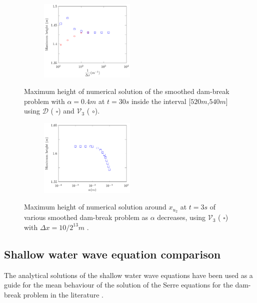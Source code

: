 \documentclass[times]{elsarticle}
\providecommand{\DIFadd}[1]{{\protect\color{blue}\uwave{#1}}} %
\providecommand{\DIFaddbegin}{} %
\providecommand{\DIFaddend}{} %
\begin{document}
\begin{figure}
	\centering
	\begin{subfigure}{\textwidth}
		\centering
		\includegraphics[width=0.5\textwidth]{Figure-28.pdf}
	\end{subfigure}
	\caption{Maximum height of numerical solution of the smoothed dam-break problem with $\alpha = 0.4m$ at $t=30s$ inside the interval [$520m$,$540m$] using $\mathcal{D}$ ({\color{blue} $\square$}) and $\mathcal{V}_3$ ({\color{red} $\circ$}).}
	\label{fig:maxamp}
\end{figure}

\begin{figure}
	\centering
	\begin{subfigure}{\textwidth}
		\centering
		\includegraphics[width=0.5\textwidth]{Figure-29.pdf}
	\end{subfigure}
	\caption{Maximum height of numerical solution around $x_{u_2}$ at $t=3s$ of various smoothed dam-break problem as $\alpha$ decreases, using $\mathcal{V}_3$ ({\color{blue} $\square$}) with $\Delta x = 10 / 2^{13}m$ .}
	\label{fig:maxampa}
\end{figure}

\subsection{Shallow water wave equation comparison}
The analytical solutions of the shallow water wave equations have been used as a guide for the mean behaviour of the \DIFaddbegin \DIFadd{numerical }\DIFaddend solution of the Serre equations for the dam-break problem in the literature \cite{Hank-etal-2010-2034,Mitsotakis-etal-2014}.
\end{document}
